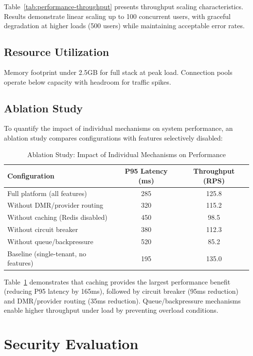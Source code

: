 \documentclass[a4paper,twoside]{sapthesis}
\begin{document}
Table~\ref{tab:performance-throughput} presents throughput scaling characteristics. Results demonstrate linear scaling up to 100 concurrent users, with graceful degradation at higher loads (500 users) while maintaining acceptable error rates.

\subsection{Resource Utilization}

Memory footprint under 2.5GB for full stack at peak load. Connection pools operate below capacity with headroom for traffic spikes.

\subsection{Ablation Study}

To quantify the impact of individual mechanisms on system performance, an ablation study compares configurations with features selectively disabled:

\begin{table}[ht]
\centering
\caption{Ablation Study: Impact of Individual Mechanisms on Performance}
\label{tab:ablation-study}
\small
\begin{tabular}{lcc}
    \hline
    Configuration & P95 Latency (ms) & Throughput (RPS) \\
    \hline
    Full platform (all features) & 285 & 125.8 \\
    Without DMR/provider routing & 320 & 115.2 \\
    Without caching (Redis disabled) & 450 & 98.5 \\
    Without circuit breaker & 380 & 112.3 \\
    Without queue/backpressure & 520 & 85.2 \\
    Baseline (single-tenant, no features) & 195 & 135.0 \\
    \hline
\end{tabular}
\end{table}

Table~\ref{tab:ablation-study} demonstrates that caching provides the largest performance benefit (reducing P95 latency by 165ms), followed by circuit breaker (95ms reduction) and DMR/provider routing (35ms reduction). Queue/backpressure mechanisms enable higher throughput under load by preventing overload conditions.

\section{Security Evaluation}
\label{sec:security-eval}
\end{document}
